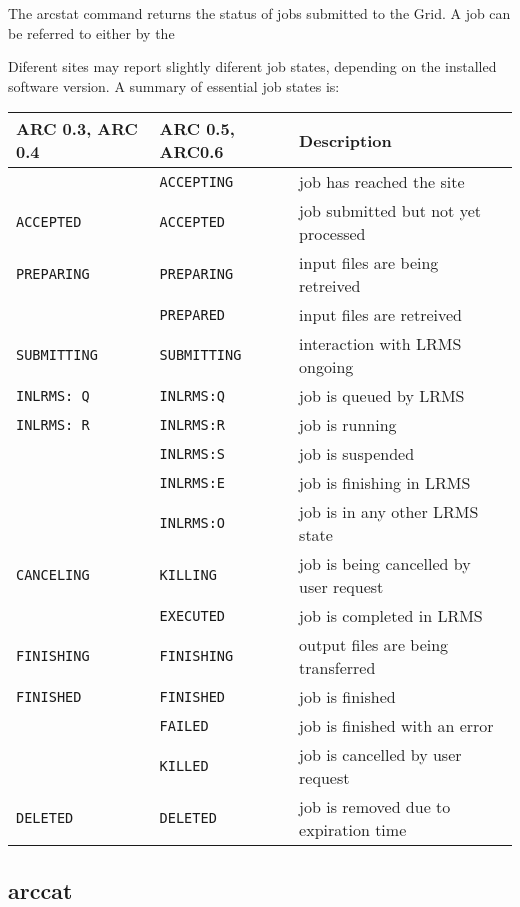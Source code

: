 The arcstat command returns the status of jobs submitted to the Grid.
A job can be referred to either by the

Diferent sites may report slightly diferent job states, depending on
the installed software version. A summary of essential job
states is:

\begin{longtable}{l|l|p{8cm}}
ARC 0.3, ARC 0.4 & ARC 0.5, ARC0.6 & Description\\ \hline
                   &\texttt{ACCEPTING} &job has reached the site\\
\texttt{ACCEPTED}  &\texttt{ACCEPTED}  &job submitted but not yet processed\\
\texttt{PREPARING} &\texttt{PREPARING} &input files are being retreived\\
                   &\texttt{PREPARED}  &input files are retreived\\
\texttt{SUBMITTING}&\texttt{SUBMITTING}&interaction with LRMS ongoing\\
\texttt{INLRMS: Q} &\texttt{INLRMS:Q}  &job is queued by LRMS\\
\texttt{INLRMS: R} &\texttt{INLRMS:R}  &job is running\\
                   &\texttt{INLRMS:S}  &job is suspended\\
                   &\texttt{INLRMS:E}  &job is finishing in LRMS\\
                   &\texttt{INLRMS:O}  &job is in any other LRMS state\\
\texttt{CANCELING} &\texttt{KILLING}   &job is being cancelled by user request\\
                   &\texttt{EXECUTED}  &job is completed in LRMS\\
\texttt{FINISHING} &\texttt{FINISHING} &output files are being transferred\\
\texttt{FINISHED}  &\texttt{FINISHED}  &job is finished\\
                   &\texttt{FAILED}    &job is finished with an error\\
                   &\texttt{KILLED}    &job is cancelled by user request\\
\texttt{DELETED}   &\texttt{DELETED}   &job is removed due to expiration time\\
\end{longtable}

\subsection{arccat}
\label{sec:arccat}

